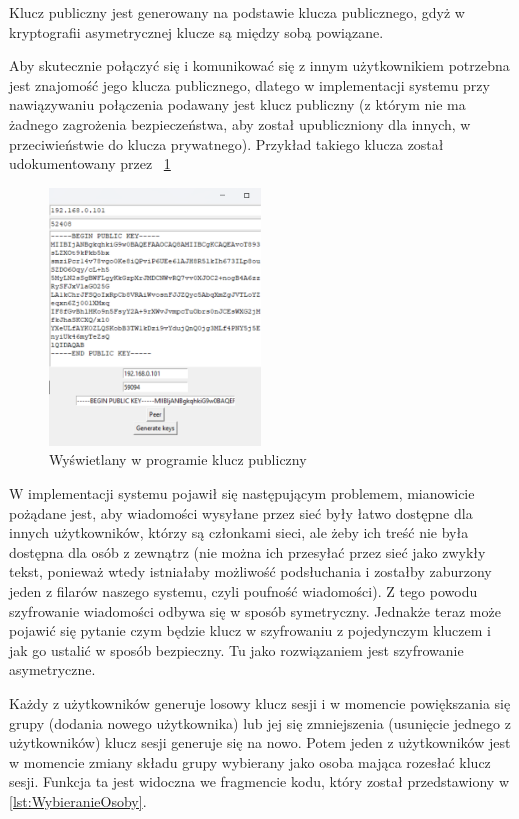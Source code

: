 Klucz publiczny jest generowany na podstawie klucza publicznego, gdyż w kryptografii asymetrycznej klucze są między sobą powiązane.
\par Aby skutecznie połączyć się i komunikować się z innym użytkownikiem potrzebna jest znajomość jego klucza publicznego, dlatego w implementacji systemu przy nawiązywaniu połączenia podawany jest klucz publiczny (z którym nie ma żadnego zagrożenia bezpieczeństwa, aby został upubliczniony dla innych, w przeciwieństwie do klucza prywatnego). Przykład takiego klucza został udokumentowany przez \figurename{~\ref{fig:KluczPubliczny}}
\begin{figure}[h]
    \centering
    \includegraphics[width=0.5\textwidth]{Images/CodeX13.png}
    \caption{Wyświetlany w programie klucz publiczny}
    \label{fig:KluczPubliczny}
\end{figure}
\newline 

W implementacji systemu pojawił się następującym problemem, mianowicie pożądane jest, aby wiadomości wysyłane przez sieć były łatwo dostępne dla innych użytkowników, którzy są członkami sieci, ale żeby ich treść nie była dostępna dla osób z zewnątrz (nie można ich przesyłać przez sieć jako zwykły tekst, ponieważ wtedy istniałaby możliwość podsłuchania i zostałby zaburzony jeden z filarów naszego systemu, czyli poufność wiadomości). Z tego powodu szyfrowanie wiadomości odbywa się w sposób symetryczny. Jednakże teraz może pojawić się pytanie czym będzie klucz w szyfrowaniu z pojedynczym kluczem i jak go ustalić w sposób bezpieczny. Tu jako rozwiązaniem jest szyfrowanie asymetryczne.

Każdy z użytkowników generuje losowy klucz sesji i w momencie powiększania się grupy (dodania nowego użytkownika) lub jej się zmniejszenia (usunięcie jednego z użytkowników) klucz sesji generuje się na nowo. Potem jeden z użytkowników jest w momencie zmiany składu grupy wybierany jako osoba mająca rozesłać klucz sesji. Funkcja ta jest widoczna we fragmencie kodu, który został przedstawiony w \lstlistingname{ \ref{lst:WybieranieOsoby}}.

